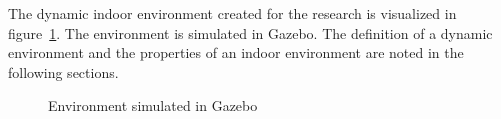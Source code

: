 The dynamic indoor environment created for the research is visualized in figure~\ref{fig:indoor_gazebo}. The environment is simulated in Gazebo. The definition of a dynamic environment and the properties of an indoor environment are noted in the following sections.

\begin{figure}[!h]
  \centering
  \caption{Environment simulated in Gazebo}
  \label{fig:indoor_gazebo}
\end{figure}
